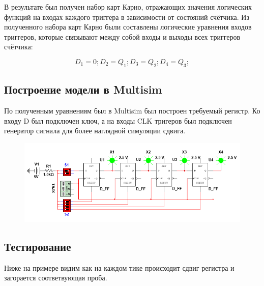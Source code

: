 В результате был получен набор карт Карно, отражающих значения логических функций
на входах каждого триггера в зависимости от состояний счётчика.
Из полученного набора карт Карно были составлены логические уравнения входов
триггеров, которые связывают между собой входы и выходы всех триггеров счётчика:

$$
    D_1=0; D_2=Q_1; D_3=Q_2; D_4=Q_3;
$$

\newpage

\subsection*{Построение модели в Multisim}

По полученным уравнениям был в Multisim был построен требуемый регистр.
Ко входу D был подключен ключ, а на входы CLK тригеров был подключен генератор
сигнала для более наглядной симуляции сдвига.

\begin{figure}[h!]
    \centering
    \includegraphics[scale=0.9]{images/image-1.png}
\end{figure}

\subsection*{Тестирование}

Ниже на примере видим как на каждом тике происходит сдвиг регистра и загорается 
соответвующая проба.

